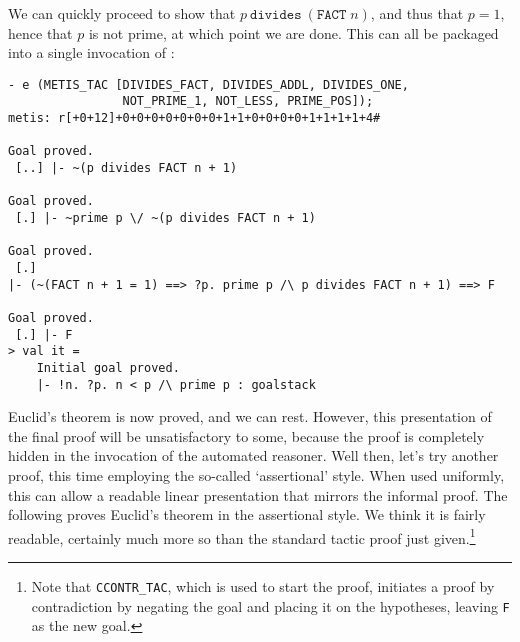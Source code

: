 We can quickly proceed to show that $p \ \mathtt{divides}\ (\mathtt{FACT}\; n)$, 
and thus that $p = 1$, hence that $p$ is not prime, at which point we are done. 
This can all be packaged into a single invocation of :
\begin{session}
\begin{verbatim}
- e (METIS_TAC [DIVIDES_FACT, DIVIDES_ADDL, DIVIDES_ONE,
                NOT_PRIME_1, NOT_LESS, PRIME_POS]);
metis: r[+0+12]+0+0+0+0+0+0+0+1+1+0+0+0+0+1+1+1+1+4#

Goal proved.
 [..] |- ~(p divides FACT n + 1)

Goal proved.
 [.] |- ~prime p \/ ~(p divides FACT n + 1)

Goal proved.
 [.]
|- (~(FACT n + 1 = 1) ==> ?p. prime p /\ p divides FACT n + 1) ==> F

Goal proved.
 [.] |- F
> val it =
    Initial goal proved.
    |- !n. ?p. n < p /\ prime p : goalstack
\end{verbatim}
\end{session}
    Euclid's theorem is now proved, and we can rest. However, this
    presentation of the final proof will be unsatisfactory to some,
    because the proof is completely hidden in the invocation of the
    automated reasoner. Well then, let's try another proof, this time
    employing the so-called `assertional' style. When used uniformly,
    this can allow a readable linear presentation that mirrors the
    informal proof. The following proves Euclid's theorem in the
    assertional style. We think it is fairly readable, certainly much
    more so than the standard tactic proof just given.\footnote{Note
      that {\tt CCONTR\_TAC}, which is used to start the proof,
      initiates a proof by contradiction by negating the goal and
      placing it on the hypotheses, leaving {\tt F} as the new goal.}

